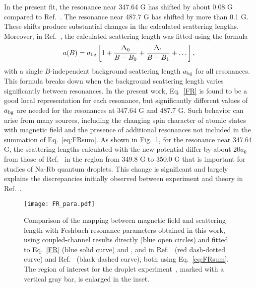 In the present fit, the resonance near 347.64 G has shifted by about 0.08 G compared to Ref.\ \cite{wang2013observation}. The resonance near 487.7 G has shifted by more than 0.1 G. These shifts produce substantial changes in the calculated scattering lengths. Moreover, in Ref.\ \cite{wang2013observation}, the calculated scattering length was fitted using the formula
\begin{equation}
a(B)=a_{\rm bg} \left[1 + \frac{\Delta_0}{B-B_0} + \frac{\Delta_1}{B-B_1} + \dots\right],
\label{eq:FRsum}
\end{equation}
with a single $B$-independent background scattering length $a_{\rm bg}$ for all resonances. This formula breaks down when the background scattering length varies significantly between resonances. In the present work, Eq.~\ref{FR} is found to be a good local representation for each resonance, but significantly different values of $a_{\rm bg}$ are needed for the resonances at 347.64 G and 487.7 G. Such behavior can arise from many sources, including the changing spin character of atomic states with magnetic field and the presence of additional resonances not included in the summation of Eq.\ \ref{eq:FRsum}. As shown in Fig.~\ref{FR_para}, for the resonance near 347.64 G, the scattering lengths calculated with the new potential differ by about $20a_0$ from those of Ref.\ \cite{wang2015formation} in the region from 349.8 G to 350.0 G that is important for studies of Na-Rb quantum droplets. This change is significant and largely explains the discrepancies initially observed between experiment and theory in Ref.\ \cite{guo2021leehuangyang}.



\begin{figure}[htbp]
\begin{center}
\texttt{[image: FR\_para.pdf]}
\end{center}
\caption[Scattering length as function of magnetic field]{Comparison of the mapping between magnetic field and scattering length with Feshbach resonance parameters obtained in this work, using coupled-channel results directly (blue open circles) and fitted to Eq.~\ref{FR} (blue solid curve) and , and in Ref.~\cite{wang2015formation} (red dash-dotted curve) and Ref.~\cite{wang2013observation} (black dashed curve), both using Eq.~\ref{eq:FRsum}. The region of interest for the droplet experiment~\cite{guo2021leehuangyang}, marked with a vertical gray bar, is enlarged in the inset. }
\label{FR_para}
\end{figure}

